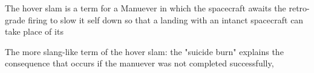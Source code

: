 \documentclass[12pt]{article}
\begin{document}
    

    The hover slam is a term for a Manuever in which the spacecraft awaits the retro-grade firing to slow it self down so that a landing with an intanct spacecraft can take place of its 

    The more slang-like term of the hover slam: the "suicide burn" explains the consequence that occurs if the manuever was not completed successfully,
    

    
\end{document}
